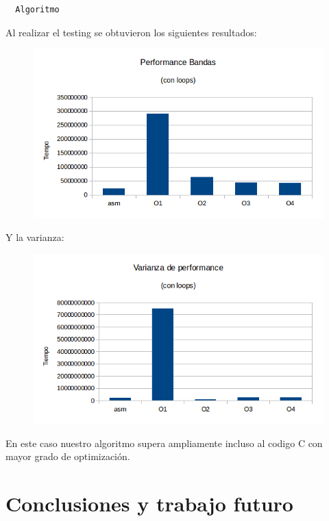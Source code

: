 \documentclass[a4paper]{article}
\begin{document}
\begin{codesnippet}
\begin{verbatim}
  Algoritmo
\end{verbatim}
\end{codesnippet}

Al realizar el testing se obtuvieron los siguientes resultados:

\begin{figure}[h!]
  \begin{center}
  \includegraphics[scale=0.66]{Graficos1.4/ban/PSO.png}
  \label{nombreparareferenciar11}
  \end{center}
\end{figure}

Y la varianza:

\begin{figure}[h!]
  \begin{center}
  \includegraphics[scale=0.66]{Graficos1.4/ban/VSO.png}
  \label{nombreparareferenciar12}
  \end{center}
\end{figure}

En este caso nuestro algoritmo supera ampliamente incluso al codigo C con mayor grado de optimización.


\section{Conclusiones y trabajo futuro}
\end{document}
